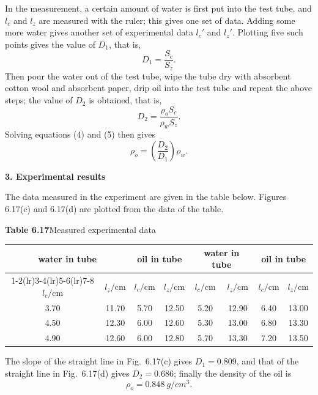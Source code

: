 In the measurement, a certain amount of water is first put into the test tube, and $l_c$ and $l_z$ are measured with the ruler; this gives one set of data. Adding some more water gives another set of experimental data $l_c'$ and $l_z'$. Plotting five such points gives the value of $D_1$, that is,
\begin{equation}\tag{4}
D_1=\frac{S_c}{S_z}.
\end{equation}
Then pour the water out of the test tube, wipe the tube dry with absorbent cotton wool and absorbent paper, drip oil into the test tube and repeat the above steps; the value of $D_2$ is obtained, that is,
\begin{equation}\tag{5}
D_2=\frac{\rho_o S_c}{\rho_w S_z}.
\end{equation}
Solving equations (4) and (5) then gives
\begin{equation}\tag{6}
\rho_o=\left(\frac{D_2}{D_1}\right)\rho_w.
\end{equation}

\textbf{3. Experimental results}

The data measured in the experiment are given in the table below. Figures 6.17(c) and 6.17(d) are plotted from the data of the table.

\begin{center}
\begin{minipage}{\linewidth}
\centering
\textbf{Table 6.17}\quad Measured experimental data\\[3pt]
\begin{tabular}{cccccccc}
\toprule
\multicolumn{2}{c}{water in tube} & \multicolumn{2}{c}{oil in tube} & \multicolumn{2}{c}{water in tube} & \multicolumn{2}{c}{oil in tube}\\
\cmidrule(lr){1-2}\cmidrule(lr){3-4}\cmidrule(lr){5-6}\cmidrule(lr){7-8}
$l_c/\mathrm{cm}$ & $l_z/\mathrm{cm}$ & $l_c/\mathrm{cm}$ & $l_z/\mathrm{cm}$ & $l_c/\mathrm{cm}$ & $l_z/\mathrm{cm}$ & $l_c/\mathrm{cm}$ & $l_z/\mathrm{cm}$\\
\midrule
3.70 & 11.70 & 5.70 & 12.50 & 5.20 & 12.90 & 6.40 & 13.00\\
4.50 & 12.30 & 6.00 & 12.60 & 5.30 & 13.00 & 6.80 & 13.30\\
4.90 & 12.60 & 6.00 & 12.80 & 5.70 & 13.30 & 7.20 & 13.50\\
\bottomrule
\end{tabular}
\end{minipage}
\end{center}

\noindent The slope of the straight line in Fig.~6.17(c) gives $D_1=0.809$, and that of the straight line in Fig.~6.17(d) gives $D_2=0.686$; finally the density of the oil is
\begin{equation*}
\rho_o=\SI{0.848}{g/cm^3}.
\end{equation*}

